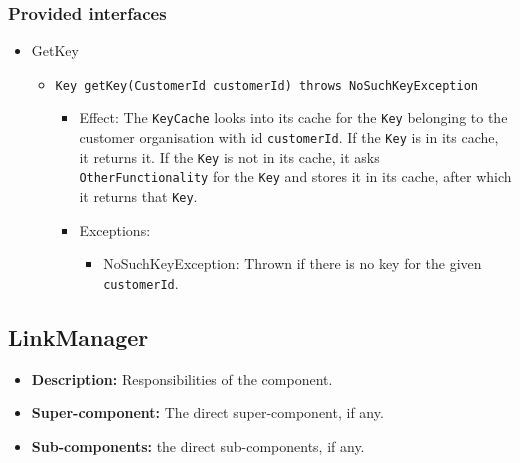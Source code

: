 \documentclass[a4paper,10pt]{article}
\begin{document}
\subsubsection*{Provided interfaces}
\begin{itemize}
    \item GetKey
    \begin{itemize}
        \item \texttt{Key getKey(CustomerId customerId) throws NoSuchKeyException}
        \begin{itemize}
            \item Effect: The \texttt{KeyCache} looks into its cache for the \texttt{Key} belonging to the customer organisation with id \texttt{customerId}. If the \texttt{Key} is in its cache, it returns it. If the \texttt{Key} is not in its cache, it asks \texttt{OtherFunctionality} for the \texttt{Key} and stores it in its cache, after which it returns that \texttt{Key}.
            \item Exceptions:
            \begin{itemize}
                \item NoSuchKeyException: Thrown if there is no key for the given \texttt{customerId}.
            \end{itemize}
        \end{itemize}
    \end{itemize}
\end{itemize}

\subsection{LinkManager}
\begin{itemize}
    \item \textbf{Description:} Responsibilities of the component.
    \item \textbf{Super-component:} The direct super-component, if any.
    \item \textbf{Sub-components:} the direct sub-components, if any.
\end{itemize}
\end{document}

